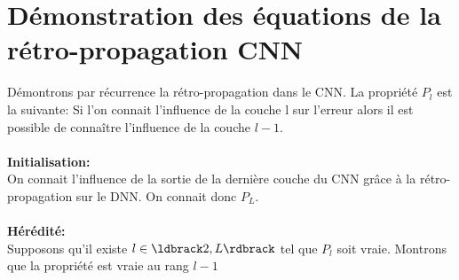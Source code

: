 \documentclass[12pt,a4paper]{extarticle}
\begin{document}
\section{Démonstration des équations de la rétro-propagation CNN}
Démontrons par récurrence la rétro-propagation dans le CNN. La propriété $P_l$ est la suivante: Si l'on connait l'influence de la couche l sur l'erreur alors il est possible de connaître l'influence de la couche $l-1$.\\ \\
\textbf{Initialisation:}\\
\indent On connait l'influence de la sortie de la dernière couche du CNN grâce à la rétro-propagation sur le DNN.
On connait donc $P_L$.\\ \\
\textbf{Hérédité:}\\
\indent Supposons qu'il existe $l\in \ldbrack 2, L \rdbrack$ tel que $P_l$ soit vraie. Montrons que la propriété est vraie au rang $l-1$\\
\end{document}
